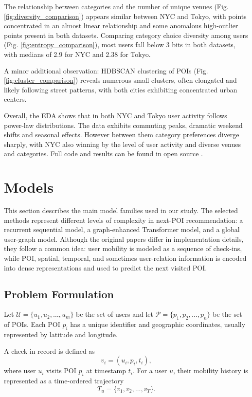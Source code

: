 \documentclass[12pt, journal]{IEEEtran}
\begin{document}
The relationship between categories and the number of unique venues (Fig. \ref{fig:diversity_comparison}) appears similar between NYC and Tokyo, with points concentrated in an almost linear relationship and some anomalous high-outlier points present in both datasets. Comparing category choice diversity among users (Fig. \ref{fig:entropy_comparison}), most users fall below 3 bits in both datasets, with medians of 2.9 for NYC and 2.38 for Tokyo.

A minor additional observation: HDBSCAN clustering of POIs (Fig. \ref{fig:cluster_comparison}) reveals numerous small clusters, often elongated and likely following street patterns, with both cities exhibiting concentrated urban centers.

Overall, the EDA shows that in both NYC and Tokyo user activity follows power-law distributions. The data exhibits commuting peaks, dramatic weekend shifts and seasonal effects. However between them category preferences diverge sharply, with NYC also winning by the level of user activity and diverse venues and categories. Full code and results can be found in open source \cite{foursquare_eda_notebook}.

\section{Models}

This section describes the main model families used in our study. The selected methods represent different levels of complexity in next-POI recommendation: a recurrent sequential model, a graph-enhanced Transformer model, and a global user-graph model. Although the original papers differ in implementation details, they follow a common idea: user mobility is modeled as a sequence of check-ins, while POI, spatial, temporal, and sometimes user-relation information is encoded into dense representations and used to predict the next visited POI.

\subsection{Problem Formulation}

Let $\mathcal{U}=\{u_1,u_2,\ldots,u_m\}$ be the set of users and let $\mathcal{P}=\{p_1,p_2,\ldots,p_n\}$ be the set of POIs. Each POI $p_i$ has a unique identifier and geographic coordinates, usually represented by latitude and longitude.

A check-in record is defined as
\begin{equation}
    v_i = (u_i, p_i, t_i),
\end{equation}
where user $u_i$ visits POI $p_i$ at timestamp $t_i$. For a user $u$, their mobility history is represented as a time-ordered trajectory
\begin{equation}
    T_u = \{v_1, v_2, \ldots, v_T\}.
\end{equation}
\end{document}

